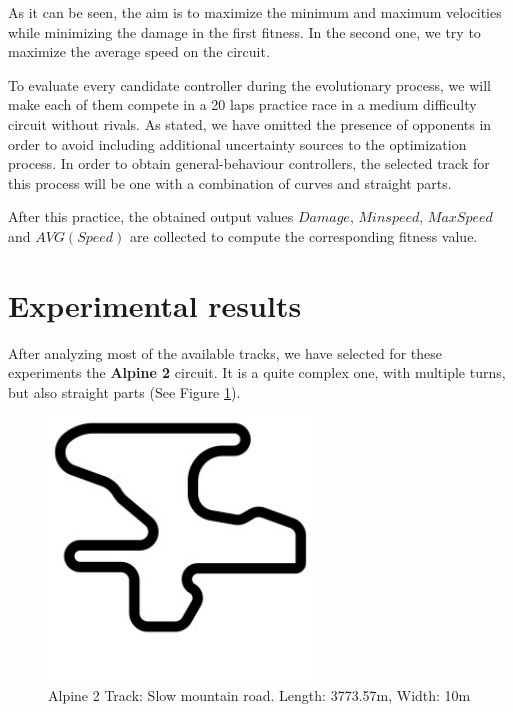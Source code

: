 \documentclass[conference]{IEEEtran}
\begin{document}
As it can be seen, the aim is to maximize the minimum and maximum velocities while minimizing the damage in the first fitness. In the second one, we try to maximize the average speed on the circuit.

To evaluate every candidate controller during the evolutionary process, we will make each of them compete in a 20 laps practice race in a medium difficulty circuit without rivals. As stated, we have omitted the presence of opponents in order to avoid including additional uncertainty sources to the optimization process. In order to obtain general-behaviour controllers, the selected track for this process will be one with a combination of curves and straight parts.

After this practice, the obtained output values $Damage$, $Minspeed$, $MaxSpeed$ and $AVG(Speed)$ are collected to compute the corresponding fitness value.



\section{Experimental results}  
\label{sec:results}

After analyzing most of the available tracks, we have selected for these experiments the \textbf{Alpine 2} circuit. It is a quite complex one, with multiple turns, but also straight parts (See Figure \ref{fig:alpine2_track}).

\begin{figure}[!ht]	
  \begin{center}
    \includegraphics[width=7cm]{fig/alpine2.jpg}
    \caption{Alpine 2 Track: Slow mountain road. Length: 3773.57m, Width: 10m}
    \label{fig:alpine2_track}	
  \end{center}	
\end{figure}
\end{document}
